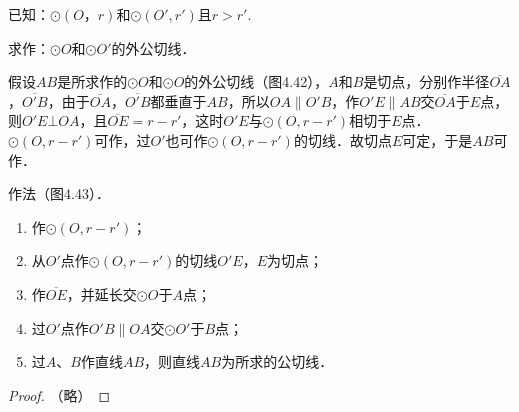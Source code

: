 已知：$\odot(O，r)$和$\odot (O',r')$且$r>r'$.

求作：$\odot O$和$\odot O'$的外公切线．

\begin{figure}[htp]
  \centering
{}
  \caption{}
\end{figure}


\begin{analyze}
  假设$AB$是所求作的$\odot O$和$\odot O$的外公切线（图4.42），$A$和$B$是切点，分别作半径$\overline{OA}$，$\overline{O'B}$，由于$\overline{OA}$，$\overline{O'B}$都垂直于$AB$，所以$OA\parallel O'B$，作$O'E\parallel AB$交$\overline{OA}$于$E$点，则$O'E\bot OA$，且$\overline{OE}=r-r'$，这时$O'E$与$\odot (O,r-r')$相切于$E$点．$\odot (O,r-r')$可作，过$O'$也可作$\odot (O,r-r')$的切线．故切点$E$可定，于是$AB$可作．
\end{analyze}

作法（图4.43）．
\begin{enumerate}
\item 作$\odot (O,r-r')$；
\item 从$O'$点作$\odot (O,r-r')$的切线$O'E$，$E$为切点；
\item 作$\overline{OE}$，并延长交$\odot O$于$A$点；
\item 过$O'$点作$O'B\parallel OA$交$\odot O'$于$B$点；
\item 过$A$、$B$作直线$AB$，则直线$AB$为所求的公切线．
\end{enumerate}

\begin{proof}
  （略）
\end{proof}

